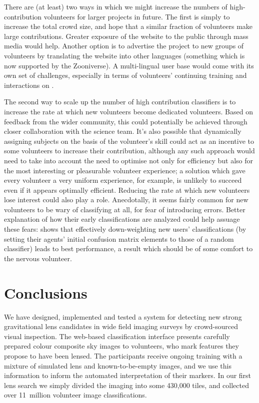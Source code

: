 \documentclass[useAMS,usenatbib,a4paper]{mn2e}
\begin{document}
There are (at least) two ways in which we might increase the numbers of
high-contribution volunteers for larger projects in future. The first is
simply to increase the total crowd size, and hope that a similar fraction of
volunteers make large contributions. Greater exposure of the website to the
public through mass media would help. Another option is to advertise the
project to new groups of volunteers by translating the website into other
languages (something which is now supported by the Zooniverse). A
multi-lingual user base would come with its own set of challenges, especially
in terms of volunteers' continuing training and interactions on \Talk.

The second way to scale up the number of high contribution classifiers is to
increase the rate at which new volunteers become dedicated volunteers. Based on
feedback from the wider \SW community, this could potentially be achieved
through closer collaboration with the science team. It's also possible that
dynamically assigning subjects on the basis of the volunteer's skill could act
as an incentive to some volunteers to increase their contribution, although any
such approach would need to take into account the need to optimise not only for efficiency but also for the most interesting or pleasurable volunteer experience; a solution which gave every volunteer a very uniform experience, for example, is unlikely to succeed even if it appears optimally efficient.  Reducing the
rate at which new volunteers lose interest could also play a role. Anecdotally,
it seems fairly common for new volunteers to be wary of classifying at all, for
fear of introducing errors. Better explanation of how their early
classifications are analyzed could help assuage these fears:
 shows that effectively down-weighting new users'
classifications (by setting their agents' initial confusion matrix elements to
those of a random classifier) leads to best performance, a result which should
be of some comfort to the nervous volunteer.




\section{Conclusions}
\label{sec:conclude}

We have designed, implemented and tested a system for   detecting new strong
gravitational lens candidates in wide field imaging surveys by crowd-sourced
visual inspection. The \SW web-based classification interface presents carefully
prepared colour composite sky images to volunteers, who mark features they
propose to  have been lensed. The participants receive ongoing training with a
mixture of simulated lens and known-to-be-empty images, and we use this
information to inform the automated interpretation of their markers. In our
first lens search we simply divided the \cfhtls imaging into some 430,000 tiles,
and collected over 11~million volunteer image classifications.
\end{document}
